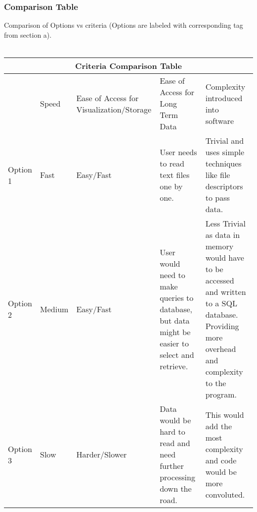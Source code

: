 \documentclass[10pt,draftclsnofoot,onecolumn]{IEEEtran}
\begin{document}
\subsubsection{Comparison Table}
Comparison of Options vs criteria (Options are labeled with corresponding tag from section a). \\ \\
\begin{tabular}{ |p{2cm}|p{2cm}|p{2cm}| p{2cm}|p{2cm}|  }
\hline
\multicolumn{5}{|c|}{Criteria Comparison Table} \\
\hline
   &Speed&Ease of Access for Visualization/Storage&Ease of Access for Long Term Data&Complexity introduced into software\\
\hline
Option 1&Fast&Easy/Fast&User needs to read text files one by one.&Trivial and uses simple techniques like file descriptors to pass data. \\
\hline
Option 2&Medium&Easy/Fast&User would need to make queries to database, but data might be easier to select and retrieve.&Less Trivial as data in memory would have to be accessed and written to a SQL database. Providing more overhead and complexity to the program.\\
\hline
Option 3&Slow&Harder/Slower&Data would be hard to read and need further processing down the road.&This would add the most complexity and code would be more convoluted. \\
\hline
\end{tabular}
\vspace{1cm}
\end{document}
